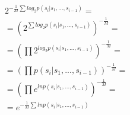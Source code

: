 \begin{align*}
    &2^{-\frac{1}{M}\sum log_2 p(s_i | s_1,...,s_{i-1})}= \\
&= (2^{\sum log_2 p(s_i | s_1,...,s_{i-1})})^{-\frac{1}{M}}= \\
&= (\prod 2^{log_2 p(s_i | s_1,...,s_{i-1})})^{-\frac{1}{M}}= \\
&= (\prod p(s_i | s_1,...,s_{i-1}))^{-\frac{1}{M}}= \\
&= (\prod e^{ln p(s_i | s_1,...,s_{i-1})})^{-\frac{1}{M}}= \\
&= e^{-\frac{1}{M}\sum ln p(s_i | s_1,...,s_{i-1})}
\end{align*}